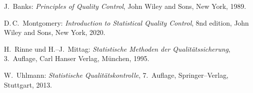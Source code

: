 \documentclass[a4paper,11pt,oneside]{article}
\begin{document}
\begin{thebibliography}{9}

J.~Banks:
\emph{Principles of Quality Control},
John Wiley and Sons, New York, 1989.

D.\,C.~Montgomery:
\emph{Introduction to Statistical Quality Control},
8nd edition, John Wiley and Sons, New York, 2020.

H.~Rinne und H.–J.~Mittag:
\emph{Statistische Methoden der Qualitätssicherung},
3.~Auflage, Carl Hanser Verlag, München, 1995.

W.~Uhlmann:
\emph{Statistische Qualitätskontrolle},
7.~Auflage, Springer–Verlag, Stuttgart, 2013.

\end{thebibliography}
\end{document}
